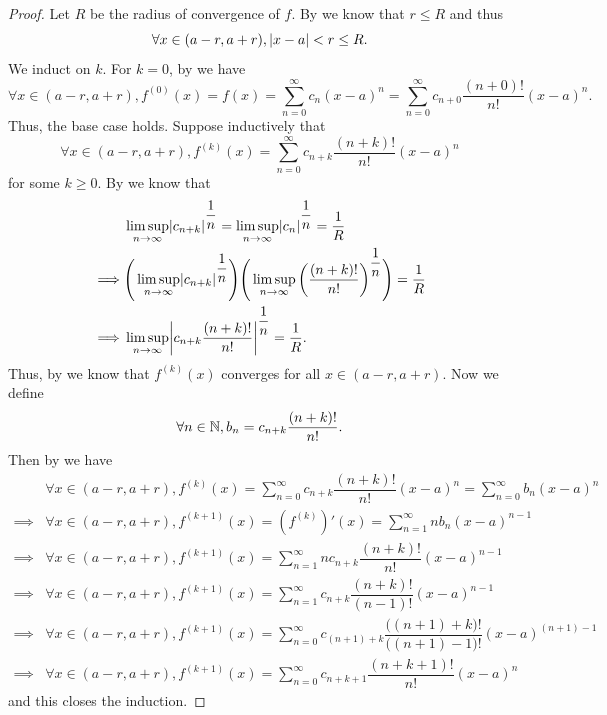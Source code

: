 \begin{proof}
  Let \(R\) be the radius of convergence of \(f\).
  By  we know that \(r \leq R\) and thus
  \[
    \forall x \in (a - r, a + r), \left\lvert x - a\right\rvert < r \leq R.
  \]
  We induct on \(k\).
  For \(k = 0\), by  we have
  \[
    \forall x \in (a - r, a + r), f^{(0)}(x) = f(x) = \sum_{n = 0}^\infty c_n (x - a)^n = \sum_{n = 0}^\infty c_{n + 0} \dfrac{(n + 0)!}{n!} (x - a)^n.
  \]
  Thus, the base case holds.
  Suppose inductively that
  \[
    \forall x \in (a - r, a + r), f^{(k)}(x) = \sum_{n = 0}^\infty c_{n + k} \dfrac{(n + k)!}{n!} (x - a)^n
  \]
  for some \(k \geq 0\).
  By  we know that
  \begin{align*}
             & \limsup_{n \to \infty} \abs{c_{n + k}}^{\dfrac{1}{n}} = \limsup_{n \to \infty} \abs{c_n}^{\dfrac{1}{n}} = \dfrac{1}{R}                                              \\
    \implies & \Bigg(\limsup_{n \to \infty} \abs{c_{n + k}}^{\dfrac{1}{n}}\Bigg) \Bigg(\limsup_{n \to \infty} \bigg(\dfrac{(n + k)!}{n!}\bigg)^{\dfrac{1}{n}}\Bigg) = \dfrac{1}{R} \\
    \implies & \limsup_{n \to \infty} \abs{c_{n + k} \dfrac{(n + k)!}{n!}}^{\dfrac{1}{n}} = \dfrac{1}{R}.
  \end{align*}
  Thus, by  we know that \(f^{(k)}(x)\) converges for all \(x \in (a - r, a + r)\).
  Now we define
  \[
    \forall n \in \mathbb{N}, b_n = c_{n + k} \dfrac{(n + k)!}{n!}.
  \]
  Then by  we have
  \begin{align*}
             & \forall x \in (a - r, a + r), f^{(k)}(x) = \sum_{n = 0}^\infty c_{n + k} \dfrac{(n + k)!}{n!} (x - a)^n = \sum_{n = 0}^\infty b_n (x - a)^n                     \\
    \implies & \forall x \in (a - r, a + r), f^{(k + 1)}(x) = (f^{(k)})'(x) = \sum_{n = 1}^\infty n b_n (x - a)^{n - 1}                                                        \\
    \implies & \forall x \in (a - r, a + r), f^{(k + 1)}(x) = \sum_{n = 1}^\infty n c_{n + k} \dfrac{(n + k)!}{n!} (x - a)^{n - 1}                                             \\
    \implies & \forall x \in (a - r, a + r), f^{(k + 1)}(x) = \sum_{n = 1}^\infty c_{n + k} \dfrac{(n + k)!}{(n - 1)!} (x - a)^{n - 1}                                         \\
    \implies & \forall x \in (a - r, a + r), f^{(k + 1)}(x) = \sum_{n = 0}^\infty c_{(n + 1) + k} \dfrac{\big((n + 1) + k\big)!}{\big((n + 1) - 1\big)!} (x - a)^{(n + 1) - 1} \\
    \implies & \forall x \in (a - r, a + r), f^{(k + 1)}(x) = \sum_{n = 0}^\infty c_{n + k + 1} \dfrac{(n + k + 1)!}{n!} (x - a)^n
  \end{align*}
  and this closes the induction.
\end{proof}


